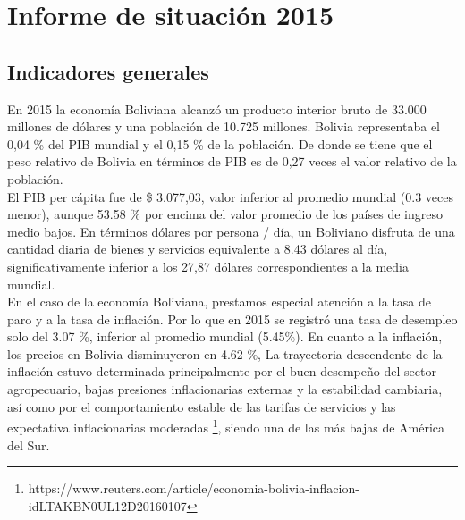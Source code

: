 


\section{Informe de situación 2015}

    \subsection{Indicadores generales}
    En 2015 la economía Boliviana alcanzó un producto interior bruto de 33.000 millones de dólares y una población de 10.725 millones. Bolivia representaba el 0,04 \% del PIB mundial y el 0,15 \%  de la población. De donde se tiene que el peso relativo de Bolivia en términos de PIB es de 0,27 veces el valor relativo de la población.\\
    El PIB per cápita fue de \$ 3.077,03, valor inferior al promedio mundial (0.3 veces menor), aunque 53.58 \% por encima del valor promedio de los países de ingreso medio bajos. En términos dólares por persona / día, un Boliviano disfruta de una cantidad diaria de bienes y servicios equivalente a 8.43 dólares al día, significativamente inferior a los 27,87 dólares correspondientes a la media mundial.\\
    En el caso de la economía Boliviana, prestamos especial atención a la tasa de paro y a la tasa de inflación. Por lo que en 2015 se registró una tasa de desempleo solo del 3.07 \%, inferior al promedio mundial (5.45\%). En cuanto a la inflación, los precios en Bolivia disminuyeron en 4.62 \%, La trayectoria descendente de la inflación estuvo determinada principalmente por el buen desempeño del sector agropecuario, bajas presiones inflacionarias externas y la estabilidad cambiaria, así como por el comportamiento estable de las tarifas de servicios y las expectativa inflacionarias moderadas \footnote{https://www.reuters.com/article/economia-bolivia-inflacion-idLTAKBN0UL12D20160107}, siendo una de las más bajas de América del Sur. \\

